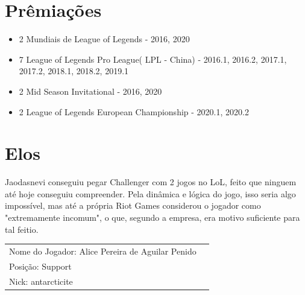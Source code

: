 \begin{multicols}{2}
	\section*{Prêmiações}
	\begin{itemize}
		\item 2 Mundiais de League of Legends - 2016, 2020
		\item 7 League of Legends Pro League( LPL - China) - 2016.1, 2016.2, 2017.1, 2017.2, 2018.1, 2018.2, 2019.1
		\item 2 Mid Season Invitational - 2016, 2020
		\item 2 League of Legends European Championship - 2020.1, 2020.2
	\end{itemize}
	
	\section*{Elos}
	Jaodasnevi conseguiu pegar Challenger com 2 jogos no LoL, feito que ninguem até hoje conseguiu compreender. Pela dinâmica e lógica do jogo, isso seria algo impossível, mas até a própria Riot Games considerou o jogador como "extremamente incomum", o que, segundo a empresa, era motivo suficiente para tal feitio.
	
\end{multicols}

\newpage

\begin{tabularx}{\linewidth}{@{}m{} m{}@{}}
	\large{Nome do Jogador: Alice Pereira de Aguilar Penido} \\
	\large{Posição: Support}\\
	\large{Nick: antarcticite}
\end{tabularx}

